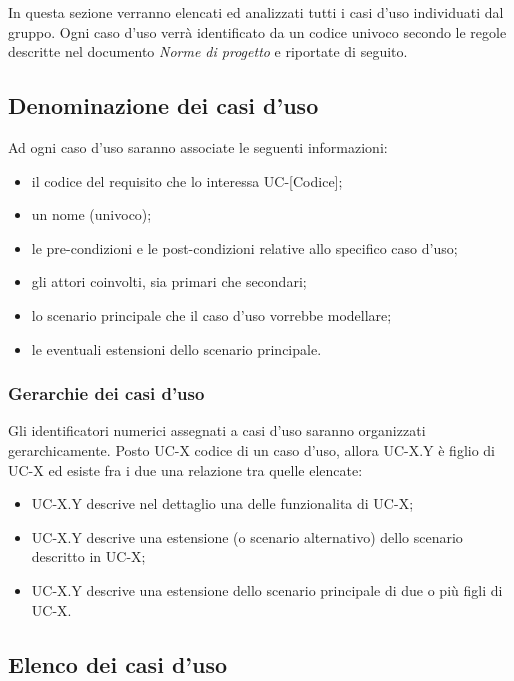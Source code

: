 In questa sezione verranno elencati ed analizzati tutti i casi d'uso individuati dal gruppo. Ogni caso d'uso verrà identificato da un codice univoco secondo le regole descritte nel documento \textit{Norme di progetto} e riportate di seguito. 
\subsection{Denominazione dei casi d'uso}
Ad ogni caso d'uso saranno associate le seguenti informazioni:
\begin{itemize}
\item il codice del requisito che lo interessa UC-[Codice];
\item un nome (univoco);
\item le pre-condizioni e le post-condizioni relative allo specifico caso d'uso;
\item gli attori coinvolti, sia primari che secondari;
\item lo scenario principale che il caso d'uso vorrebbe modellare;
\item le eventuali estensioni dello scenario principale.
\end{itemize}

\subsubsection{Gerarchie dei casi d'uso} 

Gli identificatori numerici assegnati a casi d'uso saranno organizzati gerarchicamente. Posto UC-X codice di un caso d'uso, allora UC-X.Y è figlio di UC-X ed esiste fra i due una relazione tra quelle elencate:
\begin{itemize}
\item UC-X.Y descrive nel dettaglio una delle funzionalita di UC-X;
\item UC-X.Y descrive una estensione (o scenario alternativo) dello scenario descritto in UC-X; 
\item UC-X.Y descrive una estensione dello scenario principale di due o più figli di UC-X.
\end{itemize}

\subsection{Elenco dei casi d'uso}
